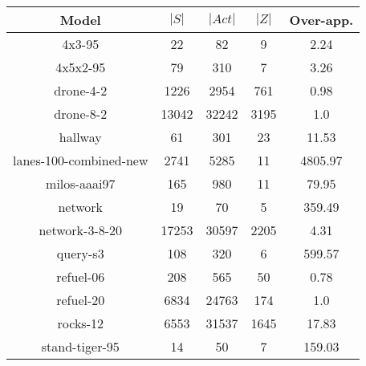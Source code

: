 \documentclass{article}
\begin{document}
\begin{table}
\begin{tabular}{|c|ccc|c|}
\hline

Model & $|S|$ & $|Act|$ & $|Z|$ & Over-app. \\ \hline 

4x3-95 & 22 & 82 & 9 & 2.24 \\
4x5x2-95 & 79 & 310 & 7 & 3.26 \\
drone-4-2 & 1226 & 2954 & 761 & 0.98 \\
drone-8-2 & 13042 & 32242 & 3195 & 1.0 \\
hallway & 61 & 301 & 23 & 11.53 \\
lanes-100-combined-new & 2741 & 5285 & 11 & 4805.97 \\
milos-aaai97 & 165 & 980 & 11 & 79.95 \\
network & 19 & 70 & 5 & 359.49 \\
network-3-8-20 & 17253 & 30597 & 2205 & 4.31 \\
query-s3 & 108 & 320 & 6 & 599.57 \\
refuel-06 & 208 & 565 & 50 & 0.78 \\
refuel-20 & 6834 & 24763 & 174 & 1.0 \\
rocks-12 & 6553 & 31537 & 1645 & 17.83 \\
stand-tiger-95 & 14 & 50 & 7 & 159.03 \\
\hline
\end{tabular}
\end{table}
\end{document}
